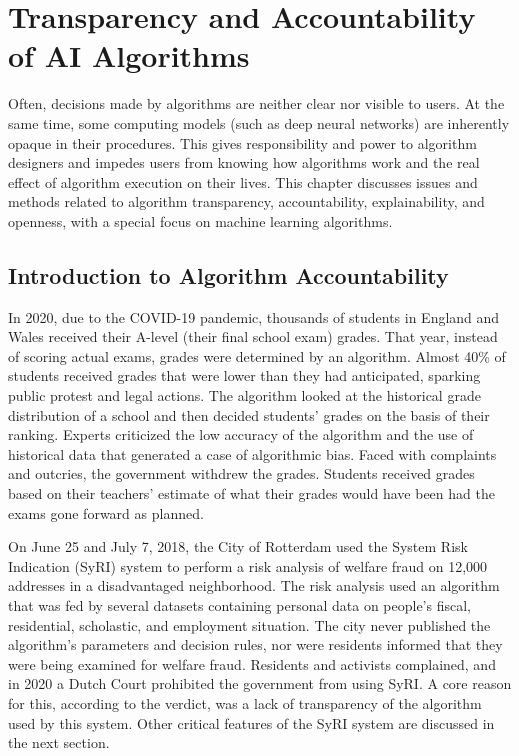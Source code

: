 




%

\setcounter{chapter}{9}

\chapter{\label{chap:10}Transparency and Accountability of AI Algorithms}

\noindent Often, decisions made by algorithms are neither clear nor visible to users. At the same time, some computing models (such as deep neural networks) are inherently opaque in their procedures. This gives responsibility and power to algorithm designers and impedes users from knowing how algorithms work and the real effect of algorithm execution on their lives. This chapter discusses issues and methods related to algorithm transparency, accountability, explainability, and openness, with a special focus on machine learning algorithms.

\section{\label{sec:10.1}Introduction to Algorithm Accountability}

In 2020, due to the COVID-19 pandemic, thousands of students in England and Wales received their A-level (their final school exam) grades. That year, instead of scoring actual exams, grades were determined by an algorithm. Almost 40\% of students received grades that were lower than they had anticipated, sparking public protest and legal actions. The algorithm looked at the historical grade distribution of a school and then decided students' grades on the basis of their ranking. Experts criticized the low accuracy of the algorithm and the use of historical data that generated a case of algorithmic bias. Faced with complaints and outcries, the government withdrew the grades. Students received grades based on their teachers' estimate of what their grades would have been had the exams gone forward as planned.

On June 25 and July 7, 2018, the City of Rotterdam used the System Risk Indication (SyRI) system to perform a risk analysis of welfare fraud on 12,000 addresses in a disadvantaged neighborhood. The risk analysis used an algorithm that was fed by several datasets containing personal data on people's fiscal, residential, scholastic, and employment situation. The city never published the algorithm's parameters and decision rules, nor were residents informed that they were being examined for welfare fraud. Residents and activists complained, and in 2020 a Dutch Court prohibited the government from using SyRI. A core reason for this, according to the verdict, was a lack of transparency of the algorithm used by this system. Other critical features of the SyRI system are discussed in the next section.

